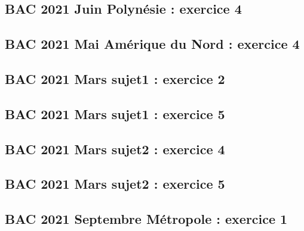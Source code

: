 \documentclass[lang=fr,edition=teacher,layout=sheet]{mxbook}
\begin{document}
\begingroup\endgroup
\par\bigskip
{}\subsection*{BAC 2021 Juin Polynésie : exercice 4}
\begingroup\endgroup
\par\bigskip
{}\subsection*{BAC 2021 Mai Amérique du Nord : exercice 4}
\begingroup\endgroup
\par\bigskip
{}\subsection*{BAC 2021 Mars sujet1 : exercice 2}
\begingroup\endgroup
\par\bigskip
{}\subsection*{BAC 2021 Mars sujet1 : exercice 5}
\begingroup\endgroup
\par\bigskip
{}\subsection*{BAC 2021 Mars sujet2 : exercice 4}
\begingroup\endgroup
\par\bigskip
{}\subsection*{BAC 2021 Mars sujet2 : exercice 5}
\begingroup\endgroup
\par\bigskip
{}\subsection*{BAC 2021 Septembre Métropole : exercice 1}
\end{document}
